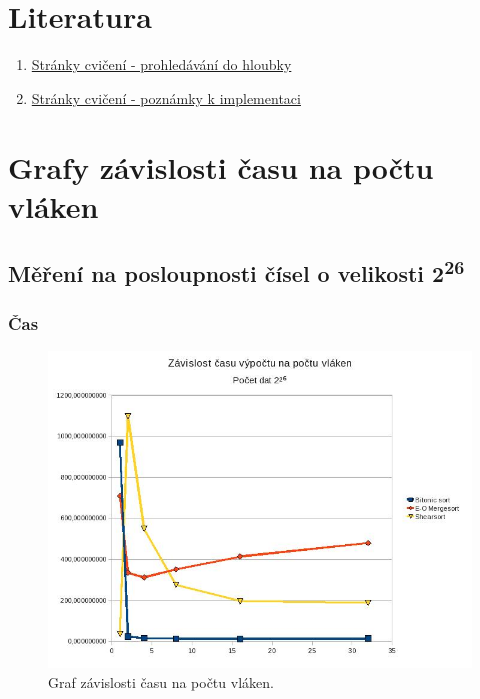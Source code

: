 \documentclass[12pt]{article}
\begin{document}
\section{Literatura}
\begin{enumerate}
\item \href{https://edux.fit.cvut.cz/courses/MI-PAR/labs/prohledavani_do_hloubky}{Stránky cvičení - prohledávání do hloubky}
\item \href{https://edux.fit.cvut.cz/courses/MI-PAR/labs/poznamky_k_implementaci}{Stránky cvičení - poznámky k implementaci}
\end{enumerate}


\appendix
\section{Grafy závislosti času na počtu vláken}

\subsection{Měření na posloupnosti čísel o velikosti 2\textsuperscript{26}}
\subsubsection{Čas}
\begin{figure}[H]
\begin{center}
\includegraphics[width=14cm]{mereni.jpg}
\caption{Graf závislosti času na počtu vláken.}
\label{fig:testAinfib}
\end{center}
\end{figure}
\end{document}
